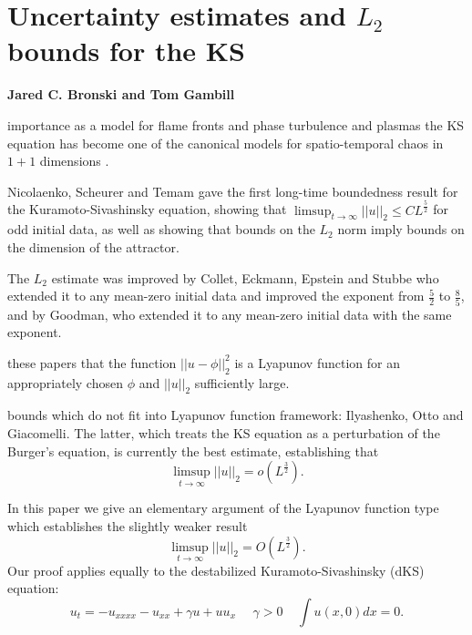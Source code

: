 
\section{Uncertainty estimates and $L_2$ bounds for the KS}

{\bf
Jared C. Bronski
and
Tom Gambill}

importance as a model for flame fronts\cite{siv} and
phase turbulence\cite{KS}
and plasmas\cite{LMRT} the
KS equation has become
one of the canonical models for
spatio-temporal chaos in $1\!+\!1$ dimensions
\cite{JOHNSON,KEVREKIDIS,Man}.

Nicolaenko, Scheurer and Temam\cite{NICO} gave the first long-time
boundedness result for the Kuramoto-Sivashinsky equation, showing
 that $\limsup_{t \rightarrow \infty} |\!|u|\!|_2
\le C L^{\frac{5}{2}}$
for odd initial data, as well as showing
that bounds on the $L_2$ norm imply bounds on the dimension of the attractor.

The $L_2$ estimate was improved by
Collet, Eckmann, Epstein and
Stubbe\cite{CEES} who  extended it to any mean-zero initial data and improved the exponent from
$\frac{5}{2}$ to $\frac{8}{5}$,
and by Goodman\cite{Good}, who extended it to
any mean-zero initial data with the same exponent.

these papers that the function $|\!|u-\phi|\!|_2^2$ is a Lyapunov function for
an appropriately chosen $\phi$ and $|\!|u|\!|_2$ sufficiently large.

bounds which do not fit into Lyapunov function framework:
Ilyashenko\cite{Ilyashenko},
Otto  and Giacomelli\cite{GO}.
The latter, which treats the KS equation as a
perturbation of the Burger's equation, is currently the best estimate, establishing that
\[
\limsup_{t \rightarrow \infty} |\!|u|\!|_2 = o(L^{\frac{3}{2}}).
\]

In this paper we give an elementary argument of the Lyapunov function
type which establishes the slightly weaker result
\[
\limsup_{t \rightarrow \infty} |\!|u|\!|_2 = O(L^{\frac{3}{2}}).
\]
Our proof applies equally to the destabilized Kuramoto-Sivashinsky (dKS)
equation:
\[
u_t = -u_{xxxx} - u_{xx} + \gamma  u + u u_x ~~~~~~\gamma > 0 ~~~~~ \int u(x,0)dx = 0.
\]

